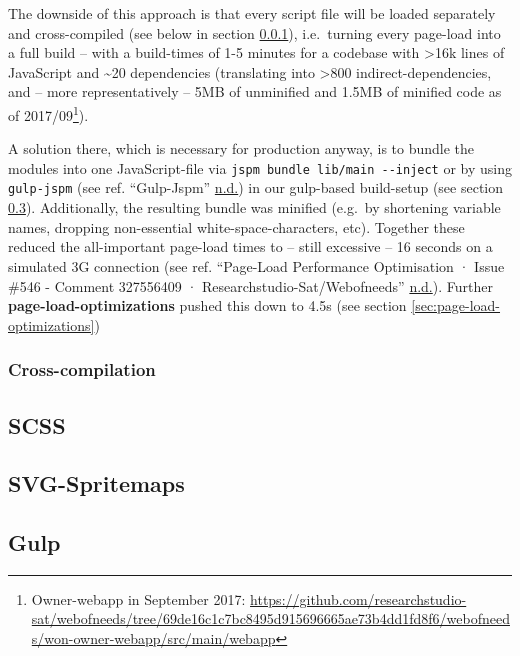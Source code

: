 \documentclass[a4paper,,tablecaptionabove]{scrbook}
\newcommand{\passthrough}[1]{#1}
\begin{document}
The downside of this approach is that every script file will be loaded
separately and cross-compiled (see below in section
\ref{sec:cross-compilation}), i.e.~turning every page-load into a full
build -- with a build-times of 1-5 minutes for a codebase with
\textgreater{}16k lines of JavaScript and \textasciitilde{}20
dependencies (translating into \textgreater{}800 indirect-dependencies,
and -- more representatively -- 5MB of unminified and 1.5MB of minified
code as of 2017/09\footnote{Owner-webapp in September 2017:
  \url{https://github.com/researchstudio-sat/webofneeds/tree/69de16c1c7bc8495d915696665ae73b4dd1fd8f6/webofneeds/won-owner-webapp/src/main/webapp}}).

A solution there, which is necessary for production anyway, is to bundle
the modules into one JavaScript-file via
\passthrough{\lstinline!jspm bundle lib/main --inject!} or by using
\passthrough{\lstinline!gulp-jspm!} (see ref. ``Gulp-Jspm''
\protect\hyperlink{ref-gulpjspm}{n.d.}) in our gulp-based build-setup
(see section \ref{sec:gulp}). Additionally, the resulting bundle was
minified (e.g.~by shortening variable names, dropping non-essential
white-space-characters, etc). Together these reduced the all-important
page-load times to -- still excessive -- 16 seconds on a simulated 3G
connection (see ref. ``Page-Load Performance Optimisation · Issue \#546
- Comment 327556409 · Researchstudio-Sat/Webofneeds''
\protect\hyperlink{ref-Pageloadperformanceoptimisation}{n.d.}). Further
\textbf{page-load-optimizations} pushed this down to 4.5s (see section
\ref{sec:page-load-optimizations})

\hypertarget{sec:cross-compilation}{%
\subsubsection{Cross-compilation}\label{sec:cross-compilation}}

\hypertarget{sec:scss}{%
\subsection{SCSS}\label{sec:scss}}

\hypertarget{sec:svg-spritemap}{%
\subsection{SVG-Spritemaps}\label{sec:svg-spritemap}}

\hypertarget{sec:gulp}{%
\subsection{Gulp}\label{sec:gulp}}
\end{document}
